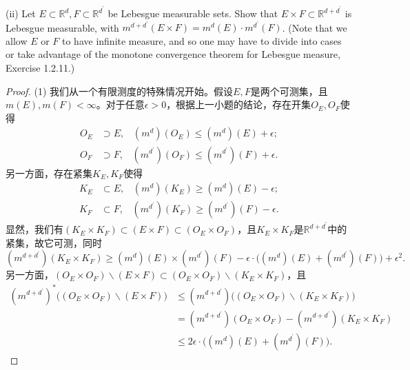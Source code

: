 \documentclass[reqno,a4paper,14pt]{amsart}
\begin{document}
(ii) Let $E\subset \mathbb{R}^d, F\subset \mathbb{R}^{d^\prime}$ be Lebesgue measurable sets. Show that $E\times F\subset \mathbb{R}^{d+d^\prime}$ is Lebesgue measurable, with $m^{d+d^\prime}(E\times F)=m^d(E) · m^{d^\prime}(F)$. (Note that we allow $E$ or $F$ to have infinite measure, and so one may have to divide into cases or take advantage of the monotone convergence theorem for Lebesgue measure, Exercise 1.2.11.)
\begin{proof}
    (1) 我们从一个有限测度的特殊情况开始。假设$E,F$是两个可测集，且$m(E),m(F)<\infty$。对于任意$\epsilon>0$，根据上一小题的结论，存在开集$O_E,O_F$使得
    \begin{equation*}
        \begin{split}
            O_E&\supset E,\;\;\; (m^d)(O_E)\leq (m^d)(E)+\epsilon;\\
            O_F&\supset F,\;\;\; (m^{d^\prime})(O_F)\leq (m^{d^\prime})(F)+\epsilon.
        \end{split}
    \end{equation*}
    另一方面，存在紧集$K_E,K_F$使得
    \begin{equation*}
        \begin{split}
            K_E&\subset E,\;\;\; (m^d)(K_E)\geq (m^d)(E)-\epsilon;\\
            K_F&\subset F,\;\;\; (m^{d^\prime})(K_F)\geq (m^{d^\prime})(F)-\epsilon.
        \end{split}
    \end{equation*}
    显然，我们有$(K_E\times K_F)\subset (E\times F)\subset (O_E\times O_F)$，且$K_E\times K_F$是$\mathbb{R}^{d+d^\prime}$中的紧集，故它可测，同时
    \begin{equation*}
        (m^{d+d^\prime})(K_E\times K_F)\geq (m^d)(E)\times (m^{d^\prime})(F)-\epsilon\cdot\bigl((m^d)(E)+(m^{d^\prime})(F)\bigr)+\epsilon^2.
    \end{equation*}
    另一方面，$(O_E\times O_F)\backslash (E\times F)\subset (O_E\times O_F)\backslash (K_E\times K_F)$，且
    \begin{equation*}
        \begin{split}
            (m^{d+d^\prime})^*\bigl((O_E\times O_F)\backslash (E\times F)\bigr)&\leq (m^{d+d^\prime})\bigl((O_E\times O_F)\backslash (K_E\times K_F)\bigr)\\
            &=(m^{d+d^\prime})(O_E\times O_F)-(m^{d+d^\prime})(K_E\times K_F)\\
            &\leq 2\epsilon\cdot\bigl((m^d)(E)+(m^{d^\prime})(F)\bigr).
        \end{split}

\end{equation*}
\end{proof}
\end{document}

